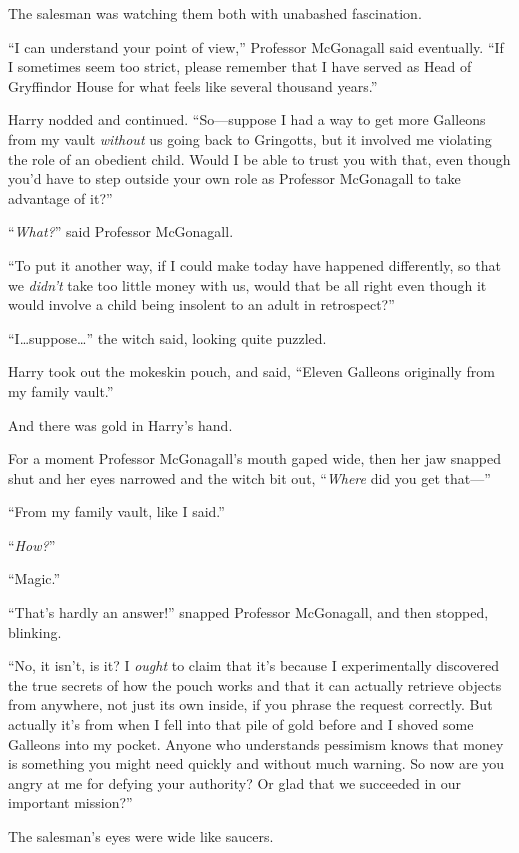 The salesman was watching them both with unabashed fascination.

“I can understand your point of view,” Professor McGonagall said eventually. “If I sometimes seem too strict, please remember that I have served as Head of Gryffindor House for what feels like several thousand years.”

Harry nodded and continued. “So—suppose I had a way to get more Galleons from my vault \emph{without} us going back to Gringotts, but it involved me violating the role of an obedient child. Would I be able to trust you with that, even though you’d have to step outside your own role as Professor McGonagall to take advantage of it?”

“\emph{What?}” said Professor McGonagall.

“To put it another way, if I could make today have happened differently, so that we \emph{didn’t} take too little money with us, would that be all right even though it would involve a child being insolent to an adult in retrospect?”

“I…suppose…” the witch said, looking quite puzzled.

Harry took out the mokeskin pouch, and said, “Eleven Galleons originally from my family vault.”

And there was gold in Harry’s hand.

For a moment Professor McGonagall’s mouth gaped wide, then her jaw snapped shut and her eyes narrowed and the witch bit out, “\emph{Where} did you get that—”

“From my family vault, like I said.”

“\emph{How?}”

“Magic.”

“That’s hardly an answer!” snapped Professor McGonagall, and then stopped, blinking.

“No, it isn’t, is it? I \emph{ought} to claim that it’s because I experimentally discovered the true secrets of how the pouch works and that it can actually retrieve objects from anywhere, not just its own inside, if you phrase the request correctly. But actually it’s from when I fell into that pile of gold before and I shoved some Galleons into my pocket. Anyone who understands pessimism knows that money is something you might need quickly and without much warning. So now are you angry at me for defying your authority? Or glad that we succeeded in our important mission?”

The salesman’s eyes were wide like saucers.


